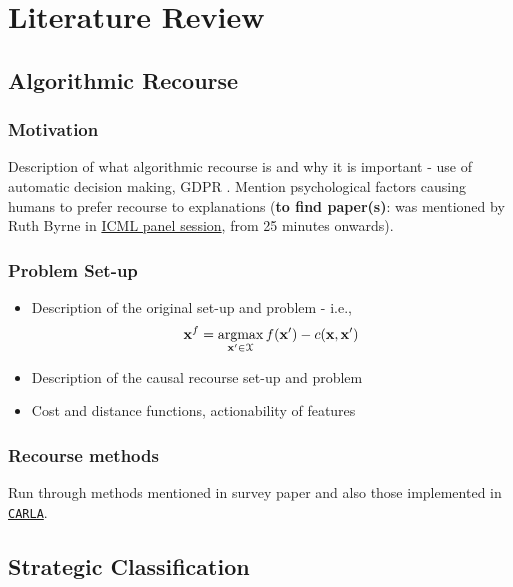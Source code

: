 \chapter{Literature Review}

\section{Algorithmic Recourse}

\subsection{Motivation}
Description of what algorithmic recourse is and why it is important - use of automatic decision making, GDPR \citep{voigtEUGeneralData2017}. Mention psychological factors causing humans to prefer recourse to explanations (\textbf{to find paper(s)}: was mentioned by Ruth Byrne in \href{https://icml.cc/virtual/2021/11705}{ICML panel session}, from 25 minutes onwards).


\subsection{Problem Set-up}
\begin{itemize}
	\item Description of the original set-up and problem - i.e., 
	\begin{equation} \label{eq:recourse_setup}
		 \mathbf{x}^f = \operatorname*{argmax}_{\mathbf{x}' \in \mathbf{\mathcal{X}}} f(\mathbf{x}') - c(\mathbf{x},\mathbf{x}')
	\end{equation} 
	\item Description of the causal recourse set-up and problem \citep{karimiAlgorithmicRecourseCounterfactual2021}
	\item Cost and distance functions, actionability of features
\end{itemize}


\subsection{Recourse methods}
Run through methods mentioned in survey paper \citep{karimiSurveyAlgorithmicRecourse2022} and also those implemented in \href{https://carla-counterfactual-and-recourse-library.readthedocs.io/en/latest/recourse.html}{\texttt{CARLA}}.





\section{Strategic Classification}

